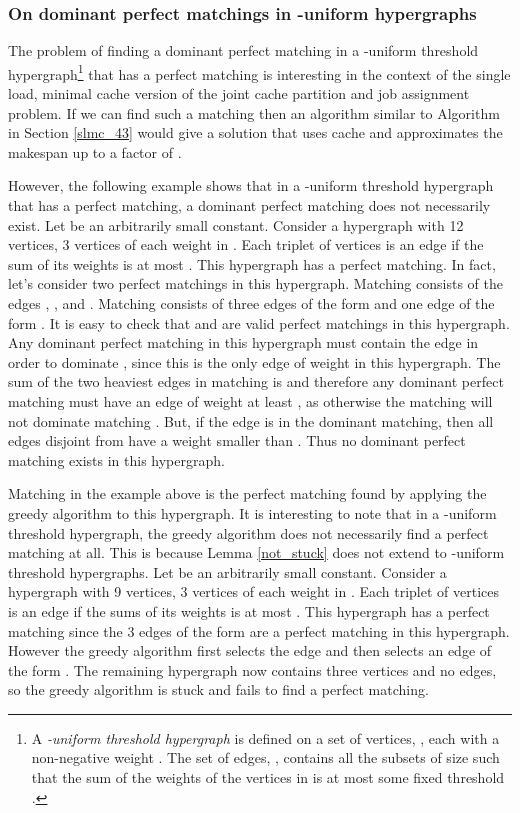 \documentclass[11pt]{article}
\begin{document}
\subsubsection{On dominant perfect matchings in -uniform hypergraphs}

The problem of finding a dominant perfect matching in a -uniform threshold hypergraph\footnote{ A \textit{-uniform threshold hypergraph} is defined on a set of vertices, , each with a non-negative weight . The set of edges, , contains all the subsets  of size  such that the sum of the weights of the vertices in  is at most some fixed threshold . } that has a perfect matching is interesting in the context of the single load, minimal cache version of the joint cache partition and job assignment problem. If we can find such a matching then an algorithm similar to Algorithm  in Section \ref{slmc_43} would give a solution that uses  cache and approximates the makespan up to a factor of .

However, the following example shows that in a -uniform threshold hypergraph that has a perfect matching,  a dominant perfect matching does not necessarily exist.
 Let  be an arbitrarily small constant. Consider a hypergraph with 12 vertices, 3 vertices of each weight in . Each triplet of vertices is an edge if the sum of its weights is at most . This hypergraph has a perfect matching. In fact, let's consider two perfect matchings in this hypergraph.
Matching  consists of the edges , ,  and .
Matching  consists of three edges of the form  and one edge of the form .
It is easy to check that  and  are valid perfect matchings in this hypergraph.
Any dominant perfect matching in this hypergraph must contain the edge  in order to dominate , since this is the only edge of weight  in this hypergraph.
The sum of the two heaviest edges in matching  is  and therefore any dominant perfect matching must have an edge of weight at least , as otherwise the matching will not dominate matching . But, if the edge  is in the dominant matching, then all edges disjoint from  have a weight smaller than . Thus no dominant perfect matching exists in this hypergraph.

Matching  in the example above is the perfect matching found by applying the greedy algorithm to this hypergraph.
It is interesting to note that in a -uniform threshold hypergraph, the greedy algorithm does not necessarily find a perfect matching at all.
This is because Lemma \ref{not_stuck} does not extend to -uniform threshold hypergraphs.
Let  be an arbitrarily small constant.
Consider a hypergraph with 9 vertices, 3 vertices of each weight in .
Each triplet of vertices is an edge if the sums of its weights is at most .
This hypergraph has a perfect matching since the 3 edges of the form  are a perfect matching in this hypergraph.
However the greedy algorithm first selects the edge  and then selects an edge of the form .
The remaining hypergraph now contains three vertices and no edges, so the greedy algorithm is stuck and fails to find a perfect matching.
\end{document}
